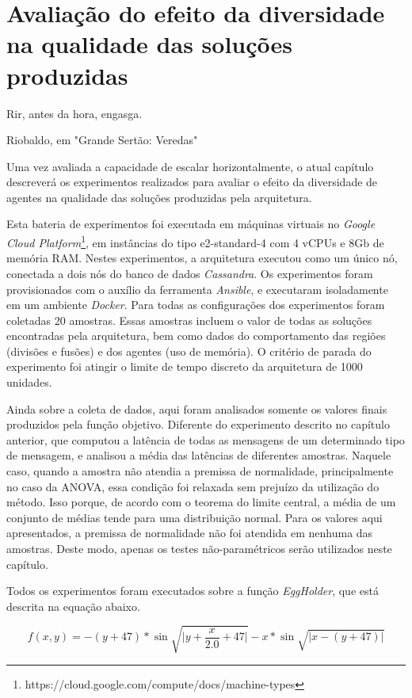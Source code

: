 \chapter{Avaliação do efeito da diversidade na qualidade das soluções produzidas}
\label{chap:exp_diversidade}
\epigraph{Rir, antes da hora, engasga.}{Riobaldo, em "Grande Sertão: Veredas"}

Uma vez avaliada a capacidade de escalar horizontalmente, o atual capítulo descreverá os experimentos realizados para avaliar o efeito da diversidade de agentes na qualidade das soluções produzidas pela arquitetura.

Esta bateria de experimentos foi executada em máquinas virtuais no \textit{Google Cloud Platform}\footnote{https://cloud.google.com/compute/docs/machine-types}, em instâncias do tipo e2-standard-4 com 4 vCPUs e 8Gb de memória RAM. Nestes experimentos, a arquitetura executou como um único nó, conectada a dois nós do banco de dados \textit{Cassandra}. Os experimentos foram provisionados com o auxílio da ferramenta \textit{Ansible}, e executaram isoladamente em um ambiente \textit{Docker}. Para todas as configurações dos experimentos foram coletadas 20 amostras. Essas amostras incluem o valor de todas as soluções encontradas pela arquitetura, bem como dados do comportamento das regiões (divisões e fusões) e dos agentes (uso de memória). O critério de parada do experimento foi atingir o limite de tempo discreto da arquitetura de 1000 unidades.

Ainda sobre a coleta de dados, aqui foram analisados somente os valores finais produzidos pela função objetivo. Diferente do experimento descrito no capítulo anterior, que computou a latência de todas as mensagens de um determinado tipo de mensagem, e analisou a média das latências de diferentes amostras. Naquele caso, quando a amostra não atendia a premissa de normalidade, principalmente no caso da ANOVA, essa condição foi relaxada sem prejuízo da utilização do método. Isso porque, de acordo com o teorema do limite central, a média de um conjunto de médias tende para uma distribuição normal.  Para os valores aqui apresentados, a premissa de normalidade não foi atendida em nenhuma das amostras. Deste modo, apenas os testes não-paramétricos serão utilizados neste capítulo. 

Todos os experimentos foram executados sobre a função \textit{EggHolder}, que está descrita na equação abaixo. 

\begin{equation*}
  f(x, y) = -(y + 47) * \sin{\sqrt{\big| y + \frac{x}{2.0} + 47 \big| }} - x * \sin{\sqrt{\big|x - (y + 47)\big|}} 
\end{equation*}

